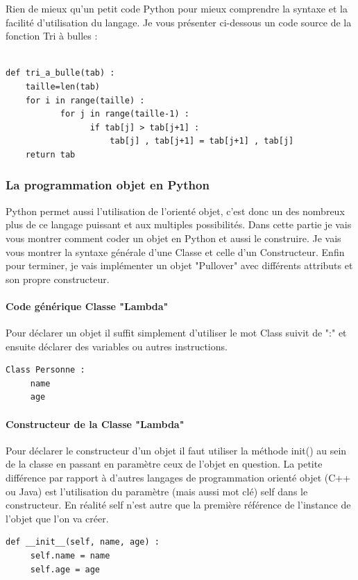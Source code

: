 \documentclass[a4paper, 12pt, twoside]{article}
\begin{document}
Rien de mieux qu'un petit code Python pour mieux comprendre la syntaxe et la facilité d'utilisation du langage. Je vous présenter ci-dessous un code source de la fonction \textsf{Tri à bulles} :

\begin{verbatim}

def tri_a_bulle(tab) :
    taille=len(tab)
    for i in range(taille) :
           for j in range(taille-1) : 
                 if tab[j] > tab[j+1] :
                     tab[j] , tab[j+1] = tab[j+1] , tab[j]
    return tab
\end{verbatim}

\subsubsection{La programmation objet en Python}
Python permet aussi l'utilisation de l'orienté objet, c'est donc un des nombreux plus de ce langage puissant et aux multiples possibilités. Dans cette partie je vais vous montrer comment coder un objet en Python et aussi le construire. Je vais vous montrer  la syntaxe générale d'une  \textsf{Classe} et celle d'un \textsf{Constructeur}. Enfin pour terminer, je vais implémenter un objet "Pullover" avec différents attributs et son propre constructeur.
\paragraph{Code générique Classe "Lambda"}
Pour déclarer un objet il suffit simplement d'utiliser le mot Class suivit de ":" et ensuite déclarer des variables ou autres instructions.
\begin{verbatim}
Class Personne : 
     name
     age
\end{verbatim}
\paragraph{Constructeur de la Classe "Lambda"}{Pour déclarer le constructeur d'un objet il faut utiliser la méthode \textsf{init()} au sein de la classe en passant en paramètre ceux de l'objet en question. La petite différence par rapport à d'autres langages de programmation orienté objet (C++ ou Java) est l'utilisation du paramètre (mais aussi mot clé) \textsf{self} dans le constructeur. En réalité \textsf{self} n'est autre que la première référence de l'instance de l'objet que l'on va créer. } 
\begin{verbatim}
def __init__(self, name, age) :
     self.name = name
     self.age = age
\end{verbatim}
\end{document}
